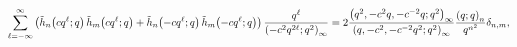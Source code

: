 \[\sum_{\ell=-\infty}^{\infty}\left(\mathop{\tilde{h}_{n}\/}\nolimits\!\left(cq^%
{\ell};q\right)\mathop{\tilde{h}_{m}\/}\nolimits\!\left(cq^{\ell};q\right)+%
\mathop{\tilde{h}_{n}\/}\nolimits\!\left(-cq^{\ell};q\right)\mathop{\tilde{h}_%
{m}\/}\nolimits\!\left(-cq^{\ell};q\right)\right)\frac{q^{\ell}}{\left(-c^{2}q%
^{2\ell};q^{2}\right)_{\infty}}=2\frac{\left(q^{2},-c^{2}q,-c^{-2}q;q^{2}%
\right)_{\infty}}{\left(q,-c^{2},-c^{-2}q^{2};q^{2}\right)_{\infty}}\frac{%
\left(q;q\right)_{n}}{q^{n^{2}}}\delta_{n,m},\]
